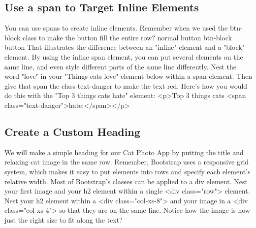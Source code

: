 \documentclass{article}%
\begin{document}
%
\subsection{Use a span to Target Inline Elements}%
\label{subsec:UseaspantoTargetInlineElements}%
You can use spans to create inline elements. Remember when we used the btn{-}block class to make the button fill the entire row?\newline%
normal button\newline%
btn{-}block button\newline%
That illustrates the difference between an "inline" element and a "block" element.\newline%
By using the inline span element, you can put several elements on the same line, and even style different parts of the same line differently.\newline%
Nest the word "love" in your "Things cats love" element below within a span element. Then give that span the class text{-}danger to make the text red.\newline%
Here's how you would do this with the "Top 3 things cats hate" element:\newline%
<p>Top 3 things cats <span class="text{-}danger">hate:</span></p>\newline%

%
\subsection{Create a Custom Heading}%
\label{subsec:CreateaCustomHeading}%
We will make a simple heading for our Cat Photo App by putting the title and relaxing cat image in the same row.\newline%
Remember, Bootstrap uses a responsive grid system, which makes it easy to put elements into rows and specify each element's relative width. Most of Bootstrap's classes can be applied to a div element.\newline%
Nest your first image and your h2 element within a single <div class="row"> element. Nest your h2 element within a <div class="col{-}xs{-}8"> and your image in a <div class="col{-}xs{-}4"> so that they are on the same line.\newline%
Notice how the image is now just the right size to fit along the text?\newline%

%
\end{document}
